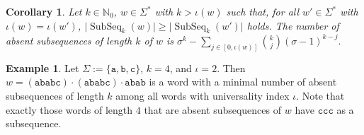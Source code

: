 \documentclass[10pt,a4paper]{amsart}
\newcommand{\N}{\mathbb{N}}
\def\ta{\mathtt{a}}
\def\tb{\mathtt{b}}
\def\tc{\mathtt{c}}
\DeclareMathOperator\ScatFact{SubSeq}
\theoremstyle{plain}
\newtheorem{corollary}{Corollary}
\theoremstyle{definition}
\newtheorem{example}{Example}
\begin{document}
\begin{corollary}
    \label{corollary:min-absent-sf-count}
    Let $k\in\N_0$, $w \in \Sigma^*$ with $k > \iota(w)$ such that, for all $w' \in \Sigma^*$ with $\iota(w) = \iota(w')$, $\vert \ScatFact_k(w) \vert \geq \vert \ScatFact_k(w') \vert$ holds. The number of absent subsequences of length $k$ of $w$ is $\sigma^k - \sum_{j \in [0, \iota(w)]} \binom{k}{j} (\sigma-1)^{k - j}.$
\end{corollary}


\begin{example}\label{example:max-SF-word}
    Let $\Sigma := \{\ta,\tb,\tc\}$, $k = 4$, and $\iota = 2$. Then $w = (\ta\tb\ta\tb\tc)\cdot(\ta\tb\ta\tb\tc)\cdot\ta\tb\ta\tb$ is a word with a minimal number of absent subsequences of length $k$ among all words with universality index $\iota$.
    Note that exactly those words of length $4$ that are absent subsequences of $w$ have $\tc\tc\tc$ as a subsequence. %
\end{example}
\end{document}
